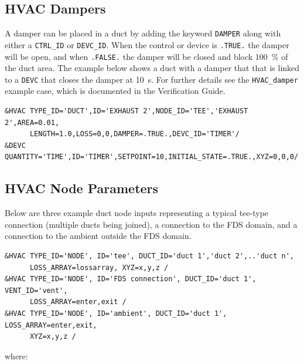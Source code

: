 \documentclass[11pt]{book}
\newcommand{\ct}{\tt\small}
\begin{document}
\subsection{HVAC Dampers}
\label{info:HVACdamper}

A damper can be placed in a duct by adding the keyword {\ct DAMPER} along with either a {\ct CTRL\_ID} or {\ct DEVC\_ID}.  When the control or device is {\ct .TRUE.} the damper will be open, and when {\ct .FALSE.} the damper will be closed and block 100~\% of the duct area.  The example below shows a duct with a damper that that is linked to a {\ct DEVC} that closes the damper at 10~s. For further details see the {\ct HVAC\_damper} example case, which is documented in the
Verification Guide.

\footnotesize
\begin{verbatim}
&HVAC TYPE_ID='DUCT',ID='EXHAUST 2',NODE_ID='TEE','EXHAUST 2',AREA=0.01,
      LENGTH=1.0,LOSS=0,0,DAMPER=.TRUE.,DEVC_ID='TIMER'/
&DEVC QUANTITY='TIME',ID='TIMER',SETPOINT=10,INITIAL_STATE=.TRUE.,XYZ=0,0,0/
\end{verbatim}\normalsize

\subsection{HVAC Node Parameters}
\label{info:HVACnode}

Below are three example duct node inputs representing a typical tee-type connection (multiple ducts being joined), a connection to the FDS domain, and a connection to the ambient outside the FDS domain.

\footnotesize
\begin{verbatim}
&HVAC TYPE_ID='NODE', ID='tee', DUCT_ID='duct 1','duct 2',..'duct n',
      LOSS_ARRAY=lossarray, XYZ=x,y,z /
&HVAC TYPE_ID='NODE', ID='FDS connection', DUCT_ID='duct 1', VENT_ID='vent',
      LOSS_ARRAY=enter,exit /
&HVAC TYPE_ID='NODE', ID='ambient', DUCT_ID='duct 1', LOSS_ARRAY=enter,exit,
      XYZ=x,y,z /
\end{verbatim}\normalsize

\noindent where:
\end{document}
